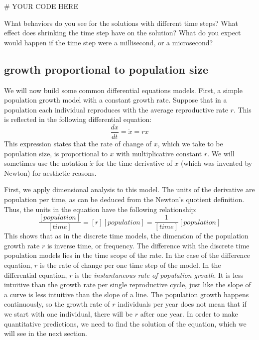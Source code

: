 \documentclass[
  letterpaper,
  DIV=11,
  numbers=noendperiod]{scrreprt}
\newenvironment{Shaded}{\begin{snugshade}}{\end{snugshade}}
\newcommand{\CommentTok}[1]{\textcolor[rgb]{0.37,0.37,0.37}{#1}}
\begin{document}
\begin{Shaded}
\begin{Highlighting}[]
\CommentTok{\# YOUR CODE HERE}
\end{Highlighting}
\end{Shaded}

What behaviors do you see for the solutions with different time steps?
What effect does shrinking the time step have on the solution? What do
you expect would happen if the time step were a millisecond, or a
microsecond?

\hypertarget{growth-proportional-to-population-size}{%
\subsection{growth proportional to population
size}\label{growth-proportional-to-population-size}}

We will now build some common differential equations models. First, a
simple population growth model with a constant growth rate. Suppose that
in a population each individual reproduces with the average reproductive
rate \(r\). This is reflected in the following differential equation:
\begin{equation}
\frac{d x} {dt} = \dot x = r x
\label{eq:linear_ode}
 \end{equation} This expression states that the rate of change of \(x\),
which we take to be population size, is proportional to \(x\) with
multiplicative constant \(r\). We will sometimes use the notation
\(\dot x\) for the time derivative of \(x\) (which was invented by
Newton) for aesthetic reasons.

First, we apply  dimensional analysis to
this model. The units of the derivative are population per time, as can
be deduced from the Newton's quotient definition. Thus, the units in the
equation have the following relationship:
\[ \frac{[population]}{[time]} = [r] [population] = \frac{1}{[time]}[population] \]
This shows that as in the discrete time models, the dimension of the
population growth rate \(r\) is inverse time, or frequency. The
difference with the discrete time population models lies in the time
scope of the rate. In the case of the difference equation, \(r\) is the
rate of change per one time step of the model. In the differential
equation, \(r\) is the \emph{instantaneous rate of population growth}.
It is less intuitive than the growth rate per single reproductive cycle,
just like the slope of a curve is less intuitive than the slope of a
line. The population growth happens continuously, so the growth rate of
\(r\) individuals per year does not mean that if we start with one
individual, there will be \(r\) after one year. In order to make
quantitative predictions, we need to find the solution of the equation,
which we will see in the next section.
\end{document}
